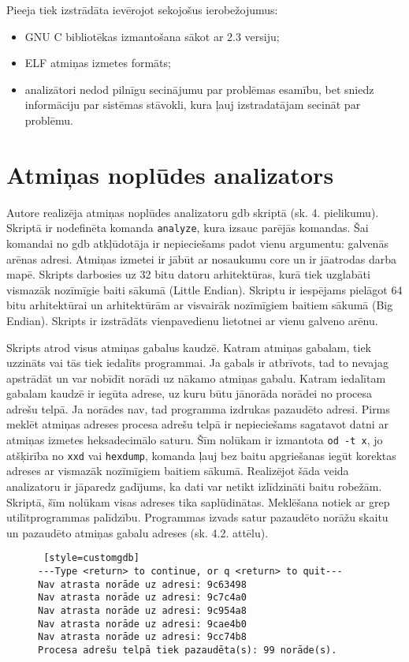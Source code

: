Pieeja tiek izstrādāta ievērojot sekojošus ierobežojumus: %
\begin{itemize}
	\item GNU C bibliotēkas izmantošana sākot ar 2.3 versiju;
    \item ELF atmiņas izmetes formāts;
    \item analizātori nedod pilnīgu secinājumu par problēmas esamību, bet sniedz informāciju par sistēmas stāvokli, kura ļauj izstradatājam secināt par problēmu.
\end{itemize}



\section{Atmiņas noplūdes analizators}
Autore realizēja atmiņas noplūdes analizatoru gdb skriptā (sk. 4. pielikumu). Skriptā ir nodefinēta komanda \texttt{analyze}, kura izsauc parējās komandas.
Šai komandai no gdb atkļūdotāja ir nepieciešams padot vienu argumentu: galvenās arēnas adresi.
Atmiņas izmetei ir jābūt ar nosaukumu core un ir jāatrodas darba mapē.
Skripts darbosies uz 32 bitu datoru arhitektūras, kurā tiek uzglabāti vismazāk nozīmīgie baiti sākumā (Little Endian).
Skriptu ir iespējams pielāgot 64 bitu arhitektūrai un arhitektūrām ar visvairāk nozīmīgiem baitiem sākumā (Big Endian).
Skripts ir izstrādāts vienpavedienu lietotnei ar vienu galveno arēnu.

Skripts atrod visus atmiņas gabalus kaudzē. 
Katram atmiņas gabalam, tiek uzzināts vai tās tiek iedalīts programmai.
Ja gabals ir atbrīvots, tad to nevajag apstrādāt un var nobīdīt norādi uz nākamo atmiņas gabalu.
Katram iedalītam gabalam kaudzē ir iegūta adrese, uz kuru būtu jānorāda norādei no procesa adrešu telpā.
Ja norādes nav, tad programma izdrukas pazaudēto adresi.
Pirms meklēt atmiņas adreses procesa adrešu telpā ir nepieciešams sagatavot datni ar atmiņas izmetes heksadecimālo saturu.
Šīm nolūkam ir izmantota \texttt{od -t x}, jo atšķirība no \texttt{xxd} vai \texttt{hexdump}, komanda ļauj bez baitu apgriešanas iegūt korektas adreses ar  vismazāk nozīmīgiem baitiem sākumā.
Realizējot šāda veida analizatoru ir jāparedz gadījums, ka dati var netikt izlīdzināti baitu robežām.
Skriptā, šīm nolūkam visas adreses tika saplūdinātas.
Meklēšana notiek ar grep utilītprogrammas palīdzību.
Programmas izvads satur pazaudēto norāžu skaitu un pazaudēto atmiņas gabalu adreses (sk. 4.2. attēlu).

\begin{figure}[h]
\begin{lstlisting} [style=customgdb]
---Type <return> to continue, or q <return> to quit---
Nav atrasta norāde uz adresi: 9c63498
Nav atrasta norāde uz adresi: 9c7c4a0
Nav atrasta norāde uz adresi: 9c954a8
Nav atrasta norāde uz adresi: 9cae4b0
Nav atrasta norāde uz adresi: 9cc74b8
Procesa adrešu telpā tiek pazaudēta(s): 99 norāde(s).
\end{lstlisting}
\caption{\textbf{\fontsize{11}{12}\selectfont {Atmiņas noplūdes atrašana, gdb skripta izvads}}}
\end{figure} %


